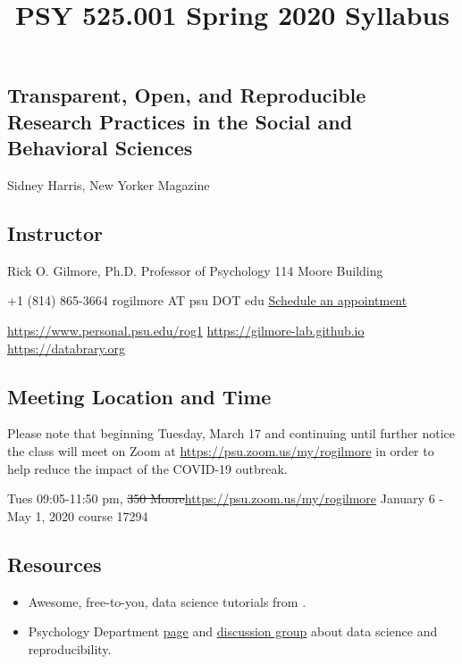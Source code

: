 \documentclass[
]{article}
\title{PSY 525.001 Spring 2020 Syllabus}
\author{}
\date{\vspace{-2.5em}}
\providecommand{\tightlist}{%
  \setlength{\itemsep}{0pt}\setlength{\parskip}{0pt}}
\begin{document}
\maketitle

\hypertarget{transparent-open-and-reproducible-research-practices-in-the-social-and-behavioral-sciences}{%
\subsection{Transparent, Open, and Reproducible Research Practices in
the Social and Behavioral
Sciences}\label{transparent-open-and-reproducible-research-practices-in-the-social-and-behavioral-sciences}}

Sidney Harris, New Yorker Magazine

\hypertarget{instructor}{%
\subsection{Instructor}\label{instructor}}

Rick O. Gilmore, Ph.D. Professor of Psychology 114 Moore Building

+1 (814) 865-3664 rogilmore AT psu DOT edu
\href{http://doodle.com/rickgilmore}{Schedule an appointment}

\url{https://www.personal.psu.edu/rog1}
\url{https://gilmore-lab.github.io} \url{https://databrary.org}

\hypertarget{meeting-location-and-time}{%
\subsection{Meeting Location and Time}\label{meeting-location-and-time}}

Please note that beginning Tuesday, March 17 and continuing until
further notice the class will meet on Zoom at
\url{https://psu.zoom.us/my/rogilmore} in order to help reduce the
impact of the COVID-19 outbreak.

Tues 09:05-11:50 pm, \sout{350
Moore}\url{https://psu.zoom.us/my/rogilmore} January 6 - May 1, 2020
course 17294

\hypertarget{resources}{%
\subsection{Resources}\label{resources}}

\begin{itemize}
\tightlist
\item
  Awesome, free-to-you, data science tutorials from .
\item
  Psychology Department
  \href{https://psu-psychology.github.io/data-science-and-reproducibility/}{page}
  and
  \href{https://psu-psychology.github.io/data-science-and-reproducibility/forum.html}{discussion
  group} about data science and reproducibility.
\end{itemize}
\end{document}
